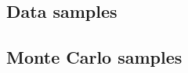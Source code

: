 \subsection{Data samples}\label{ssww13tev:data}

\subsection{Monte Carlo samples}\label{ssww13tev:mc}
